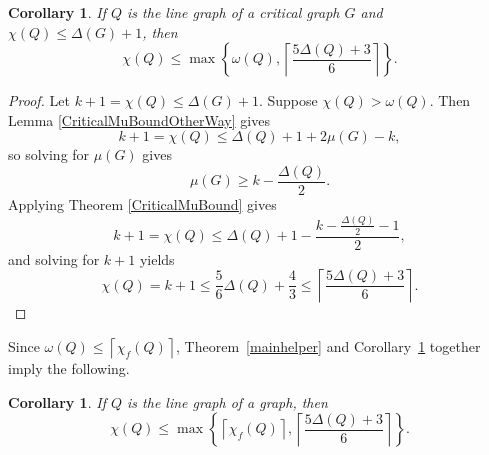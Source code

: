 \documentclass[12pt]{amsart}
\theoremstyle{plain}
\newtheorem{cor}[thm]{Corollary}
\theoremstyle{definition}
\theoremstyle{remark}
\newcommand{\set}[1]{\left\{ #1 \right\}}
\newcommand{\ceil}[1]{\left\lceil#1\right\rceil}
\begin{document}
\begin{cor}
If $Q$ is the line graph of a critical graph $G$ and $\chi(Q) \le \Delta(G) + 1$, then
\[\chi(Q) \le \max\set{\omega(Q), \ceil{\frac{5\Delta(Q) + 3}{6}}}.\]
\label{mainCorHelper}
\end{cor}
\begin{proof}
Let $k +1=\chi(Q) \le \Delta(G)+1$.  Suppose $\chi(Q) > \omega(Q)$.  Then Lemma \ref{CriticalMuBoundOtherWay} gives
\[k + 1 = \chi(Q) \le \Delta(Q) + 1 + 2\mu(G) - k,\]
so solving for $\mu(G)$ gives
\[\mu(G) \ge k - \frac{\Delta(Q)}{2}.\]
Applying Theorem \ref{CriticalMuBound} gives
\[k+1 = \chi(Q) \le \Delta(Q) + 1 - \frac{k - \frac{\Delta(Q)}{2} - 1}{2},\]
and solving for $k+1$ yields
\[\chi(Q) = k+1 \le \frac56\Delta(Q) + \frac43 \le \ceil{\frac{5\Delta(Q) + 3}{6}}.\]
\end{proof}

Since $\omega(Q) \le \ceil{\chi_f(Q)}$, Theorem~\ref{mainhelper} and Corollary~\ref{mainCorHelper} together imply the following.

\begin{cor}
If $Q$ is the line graph of a graph, then
\[\chi(Q) \le \max\set{\ceil{\chi_f(Q)}, \ceil{\frac{5\Delta(Q) + 3}{6}}}.\]
\label{mainCor}
\end{cor}
\end{document}
